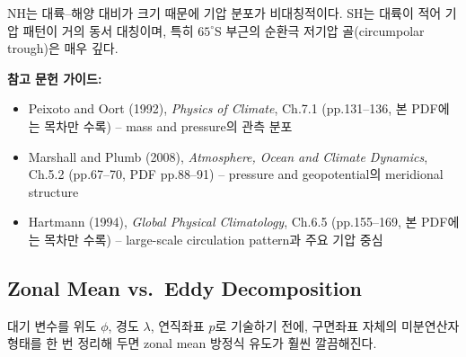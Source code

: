 \begin{hisublock}
NH는 대륙--해양 대비가 크기 때문에 기압 분포가 비대칭적이다.
SH는 대륙이 적어 기압 패턴이 거의 동서 대칭이며, 특히 $65^{\circ}$S 부근의
순환극 저기압 골(circumpolar trough)은 매우 깊다.
\end{hisublock}

\begin{hisublock}
\textbf{참고 문헌 가이드:}
\begin{itemize}
  \item Peixoto and Oort (1992), \textit{Physics of Climate}, Ch.7.1 (pp.131--136, 본 PDF에는 목차만 수록) -- mass and pressure의 관측 분포
  \item Marshall and Plumb (2008), \textit{Atmosphere, Ocean and Climate Dynamics}, Ch.5.2 (pp.67--70, PDF pp.88--91) -- pressure and geopotential의 meridional structure
  \item Hartmann (1994), \textit{Global Physical Climatology}, Ch.6.5 (pp.155--169, 본 PDF에는 목차만 수록) -- large-scale circulation pattern과 주요 기압 중심
\end{itemize}
\end{hisublock}


\subsection{Zonal Mean vs.\ Eddy Decomposition}
\label{sec:ch03-eddy-decomp}

대기 변수를 위도 $\phi$, 경도 $\lambda$, 연직좌표 $p$로 기술하기 전에,
구면좌표 자체의 미분연산자 형태를 한 번 정리해 두면 zonal mean 방정식 유도가 훨씬 깔끔해진다.

